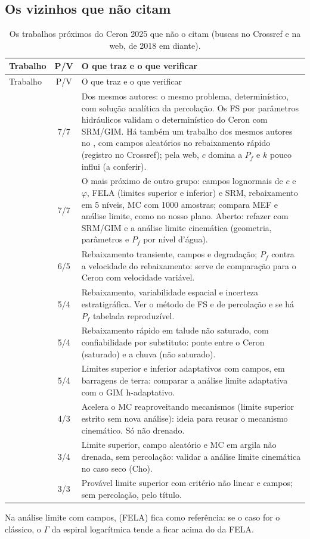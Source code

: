 \documentclass[11pt,a4paper]{article}
\begin{document}
\subsection{Os vizinhos que não citam}
{\small\setlength{\tabcolsep}{4pt}
\begin{longtable}{L{3.6cm}cL{11.4cm}}
\caption{Os trabalhos próximos do Ceron 2025 que não o citam (buscas no Crossref e na web, de 2018 em diante).}
\label{tab:ceronviz}\\
\toprule
Trabalho & P/V & O que traz e o que verificar \\
\midrule\endfirsthead
\toprule Trabalho & P/V & O que traz e o que verificar \\ \midrule\endhead
\bottomrule\endlastfoot
\citet{cilamce2025} & 7/7 & Dos mesmos autores: o mesmo problema, determinístico, com solução analítica da
  percolação. Os FS por parâmetros hidráulicos validam o determinístico do Ceron com SRM/GIM. Há também um trabalho
  dos mesmos autores no \citet{cilamce2024}, com campos aleatórios no rebaixamento rápido (registro no Crossref); pela
  web, $c$ domina a $P_f$ e $k$ pouco influi (a conferir). \\
\citet{wang2022} & 7/7 & O mais próximo de outro grupo: campos lognormais de $c$ e $\varphi$, FELA (limites superior e
  inferior) e SRM, rebaixamento em 5 níveis, MC com 1000 amostras; compara MEF e análise limite, como no nosso plano.
  Aberto: refazer com SRM/GIM e a análise limite cinemática (geometria, parâmetros e $P_f$ por nível d'água). \\
\citet{li2022} & 6/5 & Rebaixamento transiente, campos e degradação; $P_f$ contra a velocidade do rebaixamento: serve de
  comparação para o Ceron com velocidade variável. \\
\citet{estratigrafia2024} & 5/4 & Rebaixamento, variabilidade espacial e incerteza
  estratigráfica. Ver o método de FS e de percolação e se há $P_f$ tabelada reproduzível. \\
\citet{xgboost2024} & 5/4 & Rebaixamento rápido em talude não saturado, com confiabilidade por substituto: ponte
  entre o Ceron (saturado) e a chuva (não saturado). \\
\citet{rafela2022} & 5/4 & Limites superior e inferior adaptativos com campos, em barragens de terra: comparar a
  análise limite adaptativa com o GIM h-adaptativo. \\
\citet{rfela2025} & 4/3 & Acelera o MC reaproveitando mecanismos (limite superior estrito sem nova
  análise): ideia para reusar o mecanismo cinemático. Só não drenado. \\
\citet{escavados2023} & 3/4 & Limite superior, campo aleatório e MC em argila não drenada, sem
  percolação: validar a análise limite cinemática no caso seco (Cho). \\
\citet{naolinear2023} & 3/3 & Provável limite superior com critério não linear e campos; sem
  percolação, pelo título. \\
\end{longtable}}
Na análise limite com campos, \citet{huang2013} (FELA) fica como referência: se o caso for o clássico, o $\Gamma$ da
espiral logarítmica tende a ficar acima do da FELA.
\end{document}
